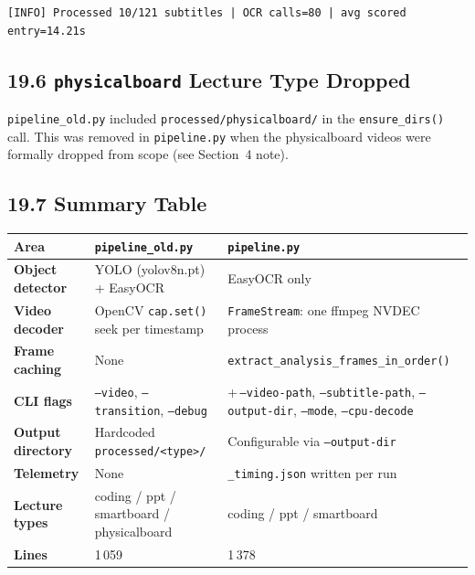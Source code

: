 \documentclass[11pt]{article}
\begin{document}
\begin{verbatim}
[INFO] Processed 10/121 subtitles | OCR calls=80 | avg scored entry=14.21s
\end{verbatim}

\subsection*{19.6 \texttt{physicalboard} Lecture Type Dropped}

\texttt{pipeline\_old.py} included \texttt{processed/physicalboard/} in the
\texttt{ensure\_dirs()} call.  This was removed in \texttt{pipeline.py} when the
physicalboard videos were formally dropped from scope (see Section~4 note).

\subsection*{19.7 Summary Table}

\begingroup\small
\renewcommand{\arraystretch}{1.2}
\begin{tabularx}{\textwidth}{>{\bfseries}l X X}
\toprule
Area & \texttt{pipeline\_old.py} & \texttt{pipeline.py} \\
\midrule
Object detector   & YOLO (yolov8n.pt) + EasyOCR & EasyOCR only \\
Video decoder     & OpenCV \texttt{cap.set()} seek per timestamp & \texttt{FrameStream}: one ffmpeg NVDEC process \\
Frame caching     & None & \texttt{extract\_analysis\_frames\_in\_order()} \\
CLI flags         & \texttt{--video}, \texttt{--transition}, \texttt{--debug} & +\,\texttt{--video-path}, \texttt{--subtitle-path}, \texttt{--output-dir}, \texttt{--mode}, \texttt{--cpu-decode} \\
Output directory  & Hardcoded \texttt{processed/<type>/} & Configurable via \texttt{--output-dir} \\
Telemetry         & None & \texttt{\_timing.json} written per run \\
Lecture types     & coding / ppt / smartboard / physicalboard & coding / ppt / smartboard \\
Lines             & 1\,059 & 1\,378 \\
\bottomrule
\end{tabularx}
\endgroup

\bigskip
\end{document}
